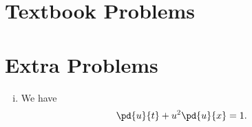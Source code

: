 \documentclass[10pt]{mypackage}
\begin{document}
\RaggedRight
\section{Textbook Problems}%
\begin{solution}[12.4, Problem 14]

\end{solution}
\begin{solution}[12.4, Problem 16]

\end{solution}
\begin{solution}[12.4, Problem 18]

\end{solution}
\section{Extra Problems}%
\begin{solution}\hfill
  \begin{enumerate}[(i)]
    \item We have
      \begin{align*}
        \pd{u}{t} + u^2\pd{u}{x} &= 1.
      \end{align*}
  \end{enumerate}
\end{solution}
\begin{solution}

\end{solution}
\begin{solution}

\end{solution}
\end{document}

